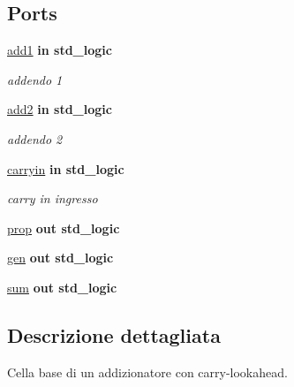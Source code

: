 \subsection*{Ports}
 \begin{DoxyCompactItemize}
\item 
\hyperlink{group___base_cell_ga2b16ee1ce0d8ffb8f85ccea13f8ba38d}{add1}  {\bfseries {\bfseries \textcolor{vhdlchar}{in}\textcolor{vhdlchar}{ }}} {\bfseries \textcolor{vhdlchar}{std\+\_\+logic}\textcolor{vhdlchar}{ }} 
\begin{DoxyCompactList}\small\item\em addendo 1 \end{DoxyCompactList}\item 
\hyperlink{group___base_cell_gac3ebb689e34fc5e7657726b18d8b5369}{add2}  {\bfseries {\bfseries \textcolor{vhdlchar}{in}\textcolor{vhdlchar}{ }}} {\bfseries \textcolor{vhdlchar}{std\+\_\+logic}\textcolor{vhdlchar}{ }} 
\begin{DoxyCompactList}\small\item\em addendo 2 \end{DoxyCompactList}\item 
\hyperlink{group___base_cell_gaa556a73dc4a4de1a0d662b25adbcbe33}{carryin}  {\bfseries {\bfseries \textcolor{vhdlchar}{in}\textcolor{vhdlchar}{ }}} {\bfseries \textcolor{vhdlchar}{std\+\_\+logic}\textcolor{vhdlchar}{ }} 
\begin{DoxyCompactList}\small\item\em carry in ingresso \end{DoxyCompactList}\item 
\hyperlink{group___base_cell_gac94466f3a0e3e34f0231abcf4b667ade}{prop}  {\bfseries {\bfseries \textcolor{vhdlchar}{out}\textcolor{vhdlchar}{ }}} {\bfseries \textcolor{vhdlchar}{std\+\_\+logic}\textcolor{vhdlchar}{ }} 
\item 
\hyperlink{group___base_cell_gaad65a9c9ebd4dd83c2835249a1ba2dff}{gen}  {\bfseries {\bfseries \textcolor{vhdlchar}{out}\textcolor{vhdlchar}{ }}} {\bfseries \textcolor{vhdlchar}{std\+\_\+logic}\textcolor{vhdlchar}{ }} 
\item 
\hyperlink{group___base_cell_ga0d9fc1b21b42422b12d68ad73ca8ef13}{sum}  {\bfseries {\bfseries \textcolor{vhdlchar}{out}\textcolor{vhdlchar}{ }}} {\bfseries \textcolor{vhdlchar}{std\+\_\+logic}\textcolor{vhdlchar}{ }} 
\end{DoxyCompactItemize}


\subsection{Descrizione dettagliata}
Cella base di un addizionatore con carry-\/lookahead.

